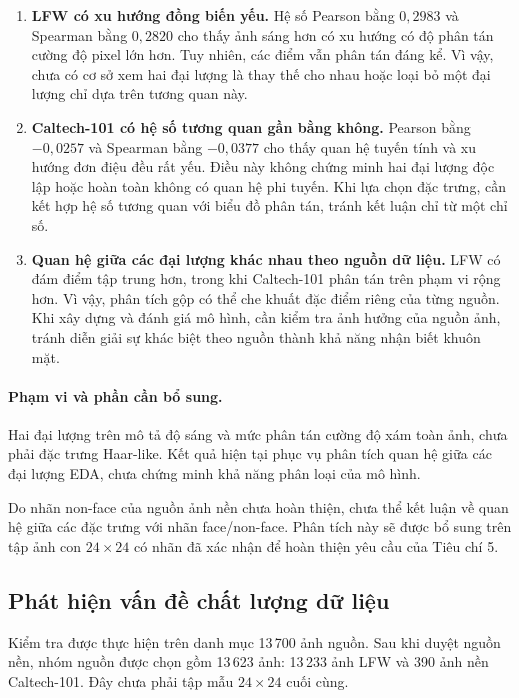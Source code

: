 \documentclass[12pt,a4paper,oneside]{report}
\begin{document}
\begin{enumerate}
    \item \textbf{LFW có xu hướng đồng biến yếu.}
    Hệ số Pearson bằng $0{,}2983$ và Spearman bằng
    $0{,}2820$ cho thấy ảnh sáng hơn có xu hướng
    có độ phân tán cường độ pixel lớn hơn.
    Tuy nhiên, các điểm vẫn phân tán đáng kể.
    Vì vậy, chưa có cơ sở xem hai đại lượng là
    thay thế cho nhau hoặc loại bỏ một đại lượng
    chỉ dựa trên tương quan này.

    \item \textbf{Caltech-101 có hệ số tương quan
    gần bằng không.}
    Pearson bằng $-0{,}0257$ và Spearman bằng
    $-0{,}0377$ cho thấy quan hệ tuyến tính và
    xu hướng đơn điệu đều rất yếu.
    Điều này không chứng minh hai đại lượng độc lập
    hoặc hoàn toàn không có quan hệ phi tuyến.
    Khi lựa chọn đặc trưng, cần kết hợp hệ số
    tương quan với biểu đồ phân tán, tránh kết luận
    chỉ từ một chỉ số.

    \item \textbf{Quan hệ giữa các đại lượng khác nhau
    theo nguồn dữ liệu.}
    LFW có đám điểm tập trung hơn, trong khi
    Caltech-101 phân tán trên phạm vi rộng hơn.
    Vì vậy, phân tích gộp có thể che khuất đặc điểm
    riêng của từng nguồn.
    Khi xây dựng và đánh giá mô hình, cần kiểm tra
    ảnh hưởng của nguồn ảnh, tránh diễn giải
    sự khác biệt theo nguồn thành khả năng
    nhận biết khuôn mặt.
\end{enumerate}

\paragraph{Phạm vi và phần cần bổ sung.}

Hai đại lượng trên mô tả độ sáng và mức phân tán
cường độ xám toàn ảnh, chưa phải đặc trưng Haar-like.
Kết quả hiện tại phục vụ phân tích quan hệ giữa
các đại lượng EDA, chưa chứng minh khả năng
phân loại của mô hình.

Do nhãn non-face của nguồn ảnh nền chưa hoàn thiện,
chưa thể kết luận về quan hệ giữa các đặc trưng
với nhãn face/non-face.
Phân tích này sẽ được bổ sung trên tập ảnh con
$24 \times 24$ có nhãn đã xác nhận để hoàn thiện
yêu cầu của Tiêu chí 5.

\subsection{Phát hiện vấn đề chất lượng dữ liệu}

Kiểm tra được thực hiện trên danh mục 13\,700 ảnh nguồn.
Sau khi duyệt nguồn nền, nhóm nguồn được chọn gồm
13\,623 ảnh: 13\,233 ảnh LFW và 390 ảnh nền Caltech-101.
Đây chưa phải tập mẫu $24 \times 24$ cuối cùng.
\end{document}
